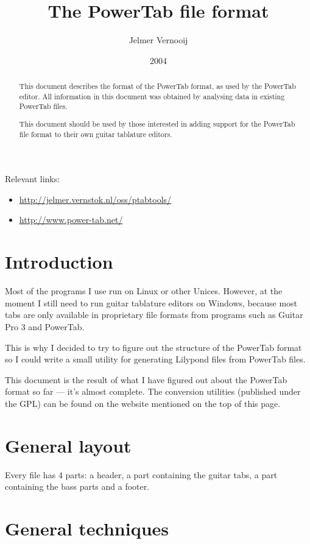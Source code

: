 \documentclass[a4paper]{article}
\begin{document}
\title{The PowerTab file format}
\date{2004}
\author{Jelmer Vernooij}
\maketitle

Relevant links:

\begin{itemize}
\item \url{http://jelmer.vernstok.nl/oss/ptabtools/}
\item \url{http://www.power-tab.net/}
\end{itemize}

\begin{abstract}
This document describes the format of the PowerTab format, as 
used by the PowerTab editor. All information 
in this document was obtained by analysing data in existing PowerTab files.

This document should be used by those interested in adding support 
for the PowerTab file format to their own guitar tablature editors.
\end{abstract}

\section{Introduction}

Most of the programs I use run on Linux or other Unices. However, 
at the moment I still need to run guitar tablature editors on Windows, 
because most tabs are only available in proprietary file formats from 
programs such as Guitar Pro 3 and PowerTab.

This is why I decided to try to figure out the structure of the PowerTab 
format so I could write a small utility for generating Lilypond files 
from PowerTab files.

This document is the result of what I have figured out about the PowerTab 
format so far --- it's almost complete. The conversion utilities 
(published under the GPL) can be found on the website mentioned on the top of 
this page.

\section{General layout}

Every file has 4 parts: a header, a part containing the guitar tabs, a 
part containing the bass parts and a footer.

\section{General techniques}
\end{document}
